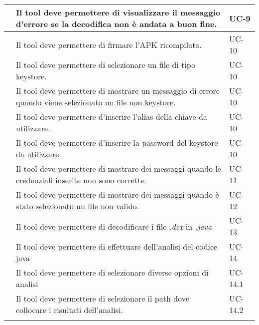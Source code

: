 \begin{longtable}{ | c| C{7cm} |C{3cm} |}
           & Il tool deve permettere di visualizzare il messaggio d'errore se la decodifica non è andata a buon fine.              & UC-9           \\\hline

           & Il tool deve permettere di firmare l'APK ricompilato.                                                                 & UC-10          \\\hline
        & Il tool deve permettere di selezionare un file di tipo keystore.                                                      & UC-10          \\\hline
        & Il tool deve permettere di mostrare un messaggio di errore quando viene selezionato un file non keystore.             & UC-10          \\\hline
        & Il tool deve permettere d'inserire l'alias della chiave da utilizzare.                                                & UC-10          \\\hline
        & Il tool deve permettere d'inserire la password del keystore da utilizzare.                                            & UC-10          \\\hline
    \setcounter{subCount}{0}

           & Il tool deve permettere di mostrare dei messaggi quando le credenziali inserite non sono corrette.                    & UC-11          \\\hline
           & Il tool deve permettere di mostrare dei messaggi quando è stato selezionato un file non valido.                       & UC-12          \\\hline
           & Il tool deve permettere di decodificare i file \textit{.dex} in \textit{.java}                                        & UC-13          \\\hline
           & Il tool deve permettere di effettuare dell'analisi del codice java                                                    & UC-14          \\\hline
        & Il tool deve permettere di selezionare diverse opzioni di analisi                                                     & UC-14.1        \\\hline
        & Il tool deve permettere di selezionare il path dove collocare i risultati dell'analisi.                               & UC-14.2        \\\hline
    \setcounter{subCount}{0}


\end{longtable}
